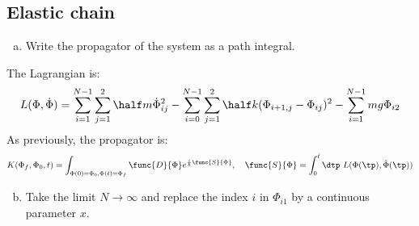 \newcommand{\pos}{{\Phi}}
\newcommand{\bp}{{\beta^\prime}}

\subsection{Elastic chain}

\begin{enumerate}[(a)]
  \item Write the propagator of the system as a path integral.
\end{enumerate}

The Lagrangian is:
\begin{equation}
  L(\pos,\dot{\pos})
  =
  \sum_{i=1}^{N-1} \sum_{j=1}^{2} \half m\dot{\pos}_{ij}^2 -
  \sum_{i=0}^{N-1} \sum_{j=1}^{2} \half k(\pos_{i+1,j} - \pos_{ij})^2 -
  \sum_{i=1}^{N-1} mg\pos_{i2}
\end{equation}
As previously, the propagator is:
\begin{equation}
  \label{propagator}
  K(\pos_f,\pos_0,t) = \int_{\pos(0)=\pos_0,\pos(t)=\pos_f}\func{D}{\pos}
  e^{\frac{i}{\hbar} \func{S}{\pos}} ,\quad \func{S}{\pos} = \int_{0}^{t}\dtp\
  L(\pos(\tp), \dot{\pos}(\tp))
\end{equation}

\begin{enumerate}[(a)]
  \setcounter{enumi}{1}
  \item Take the limit $N\to\infty$ and replace the index $i$ in $\pos_{i1}$ by
        a continuous parameter $x$.
\end{enumerate}

